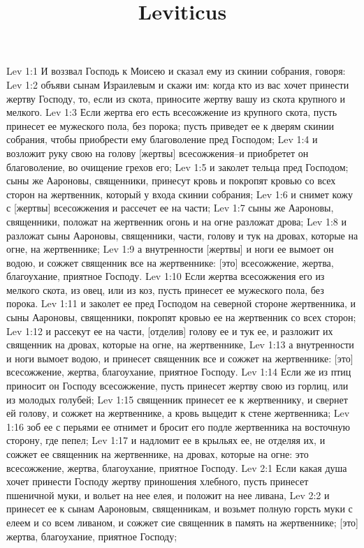 

\title{Leviticus}

Lev 1:1  И воззвал Господь к Моисею и сказал ему из скинии собрания, говоря:
Lev 1:2  объяви сынам Израилевым и скажи им: когда кто из вас хочет принести жертву Господу, то, если из скота, приносите жертву вашу из скота крупного и мелкого.
Lev 1:3  Если жертва его есть всесожжение из крупного скота, пусть принесет ее мужеского пола, без порока; пусть приведет ее к дверям скинии собрания, чтобы приобрести ему благоволение пред Господом;
Lev 1:4  и возложит руку свою на голову [жертвы] всесожжения--и приобретет он благоволение, во очищение грехов его;
Lev 1:5  и заколет тельца пред Господом; сыны же Аароновы, священники, принесут кровь и покропят кровью со всех сторон на жертвенник, который у входа скинии собрания;
Lev 1:6  и снимет кожу с [жертвы] всесожжения и рассечет ее на части;
Lev 1:7  сыны же Аароновы, священники, положат на жертвенник огонь и на огне разложат дрова;
Lev 1:8  и разложат сыны Аароновы, священники, части, голову и тук на дровах, которые на огне, на жертвеннике;
Lev 1:9  а внутренности [жертвы] и ноги ее вымоет он водою, и сожжет священник все на жертвеннике: [это] всесожжение, жертва, благоухание, приятное Господу.
Lev 1:10  Если жертва всесожжения его из мелкого скота, из овец, или из коз, пусть принесет ее мужеского пола, без порока.
Lev 1:11  и заколет ее пред Господом на северной стороне жертвенника, и сыны Аароновы, священники, покропят кровью ее на жертвенник со всех сторон;
Lev 1:12  и рассекут ее на части, [отделив] голову ее и тук ее, и разложит их священник на дровах, которые на огне, на жертвеннике,
Lev 1:13  а внутренности и ноги вымоет водою, и принесет священник все и сожжет на жертвеннике: [это] всесожжение, жертва, благоухание, приятное Господу.
Lev 1:14  Если же из птиц приносит он Господу всесожжение, пусть принесет жертву свою из горлиц, или из молодых голубей;
Lev 1:15  священник принесет ее к жертвеннику, и свернет ей голову, и сожжет на жертвеннике, а кровь выцедит к стене жертвенника;
Lev 1:16  зоб ее с перьями ее отнимет и бросит его подле жертвенника на восточную сторону, где пепел;
Lev 1:17  и надломит ее в крыльях ее, не отделяя их, и сожжет ее священник на жертвеннике, на дровах, которые на огне: это всесожжение, жертва, благоухание, приятное Господу.
Lev 2:1  Если какая душа хочет принести Господу жертву приношения хлебного, пусть принесет пшеничной муки, и вольет на нее елея, и положит на нее ливана,
Lev 2:2  и принесет ее к сынам Аароновым, священникам, и возьмет полную горсть муки с елеем и со всем ливаном, и сожжет сие священник в память на жертвеннике; [это] жертва, благоухание, приятное Господу;

